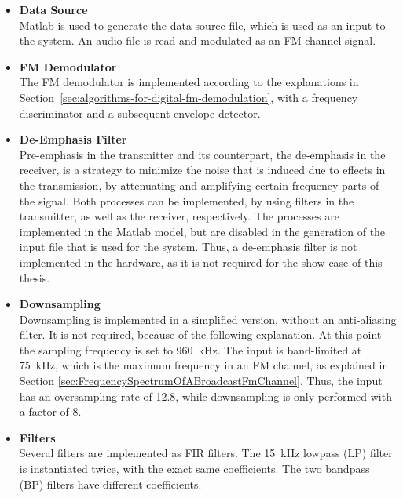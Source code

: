 \begin{itemize}
  \item \textbf{Data Source}\\
      Matlab is used to generate the data source file, which is used as an input to the system.
      An audio file is read and modulated as an FM channel signal.\\

  \item \textbf{FM Demodulator}\\
      The FM demodulator is implemented according to the explanations in Section~\ref{sec:algorithms-for-digital-fm-demodulation}, with a frequency discriminator and a subsequent envelope detector.\\

  \item \textbf{De-Emphasis Filter}\\
      Pre-emphasis in the transmitter and its counterpart, the de-emphasis in the receiver, is a strategy to minimize the noise that is induced due to effects in the transmission, by attenuating and amplifying certain frequency parts of the signal.
      Both processes can be implemented, by using filters in the transmitter, as well as the receiver, respectively.
      The processes are implemented in the Matlab model, but are disabled in the generation of the input file that is used for the system.
      Thus, a de-emphasis filter is not implemented in the hardware, as it is not required for the show-case of this thesis.\\

  \item \textbf{Downsampling}\\
      Downsampling is implemented in a simplified version, without an anti-aliasing filter.
      It is not required, because of the following explanation.
      At this point the sampling frequency is set to 960~kHz.
      The input is band-limited at 75~kHz, which is the maximum frequency in an FM channel, as explained in Section \ref{sec:FrequencySpectrumOfABroadcastFmChannel}.
      Thus, the input has an oversampling rate of 12.8, while downsampling is only performed with a factor of 8.\\

  \item \textbf{Filters}\\
      Several filters are implemented as FIR filters.
      The 15~kHz lowpass (LP) filter is instantiated twice, with the exact same coefficients.
      The two bandpass (BP) filters have different coefficients.\\


\end{itemize}
